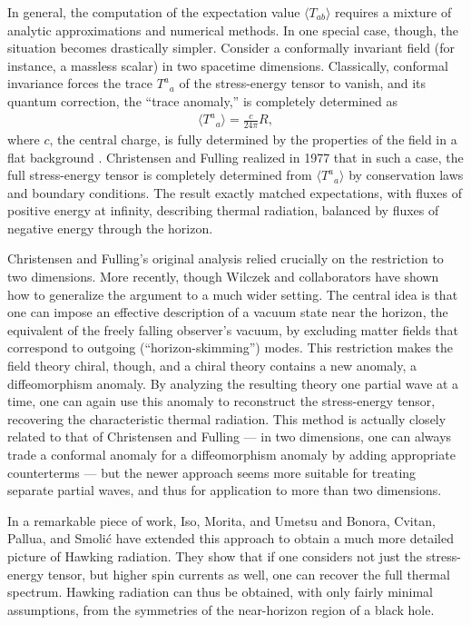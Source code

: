 \documentclass[12pt]{article}
\begin{document}
In general, the computation of  the expectation value $\langle T_{ab}\rangle$
requires a mixture of analytic approximations and numerical methods.  
In one special case, though, the situation becomes drastically simpler.  
Consider a conformally invariant field (for instance, a massless scalar)
in two spacetime dimensions.  Classically, conformal invariance forces
the trace $T^a{}_a$ of the stress-energy tensor to vanish, and its quantum 
correction, the ``trace anomaly,'' is completely determined as
\begin{align*}
\langle T^a{}_a\rangle = \frac{c}{24\pi} R  ,
\end{align*}
where $c$, the central charge, is fully determined by the properties of the 
field in a flat background \cite{FMS}.  Christensen and Fulling \cite{Christensen}  
realized in 1977 that in such a case, the full stress-energy tensor  is 
completely determined  from $\langle T^a{}_a\rangle$ by conservation 
laws and boundary conditions.   The result exactly matched expectations,
with fluxes of positive energy at infinity, describing thermal radiation, 
balanced by fluxes of negative energy through the horizon.

Christensen and Fulling's original analysis relied crucially on the
restriction to two dimensions.  More recently, though Wilczek and   
collaborators \cite{Robinson,Iso,Umetsu} have shown how to generalize
the argument to a much wider setting.  The central idea is that one can
impose an effective description of a vacuum state near the horizon,
the equivalent of the freely falling observer's vacuum, by excluding
matter fields that correspond to outgoing (``horizon-skimming'') modes.  
This restriction makes the field theory chiral, though, and a chiral theory
contains a new anomaly, a diffeomorphism anomaly.  By analyzing the 
resulting theory one partial wave at a time, one can again use this anomaly 
to reconstruct the stress-energy tensor, recovering the characteristic 
thermal radiation.  This method is actually closely related to that
of Christensen and Fulling
--- in two dimensions, one can always trade a conformal anomaly for a 
diffeomorphism anomaly by adding appropriate counter\-terms --- but
the newer approach seems more suitable for treating separate partial
waves, and thus for application to more than two dimensions.

In a remarkable piece of work, Iso, Morita, and Umetsu \cite{IMU}
and Bonora, Cvitan, Pallua, and Smoli{\'c} \cite{BCa,BCb}  have
extended this approach to obtain a much more detailed
picture of Hawking radiation. They show that if one considers not
 just the stress-energy tensor, but higher spin currents as well, 
one can recover the full thermal spectrum.
Hawking radiation can thus be obtained, with only
fairly minimal assumptions, from the symmetries of the near-horizon 
region of a black hole.
\end{document}
